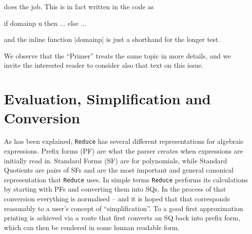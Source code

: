 \documentclass[12pt,twoside,openright]{memoir}
\newcommand{\reduce}{\texttt{Reduce}\xspace}
\begin{document}
does the job. This is in fact written in the code as
\begin{rlispverb}
  if domainp u then ...
  else ...
\end{rlispverb}
and the inline function |domainp| is just a shorthand for the longer test.

We observe that the ``Primer'' \cite{melenk} treats the same topic in more
details, and we invite the interested reader to consider also that text on this
issue.

\section{Evaluation, Simplification and Conversion}
\label{sec:eval-simpl-conv}

As has been explained, \reduce has several different representations for
algebraic expressions. Prefix forms (PF) are what the parser creates when
expressions are initially read in. Standard Forms (SF) are for polynomials,
while Standard Quotients are pairs of SFs and are the most important and
general canonical representation that \reduce uses. In simple terms
\reduce performs its calculations by starting with PFs and converting them into
SQs. In the process of that conversion everything is normalised -- and it
is hoped that that corresponds reasonably to a user's concept of
``simplification''. To a good first approximation printing is achieved via
a route that first converts an SQ back into prefix form, which can then
be rendered in some human readable form.
\end{document}
